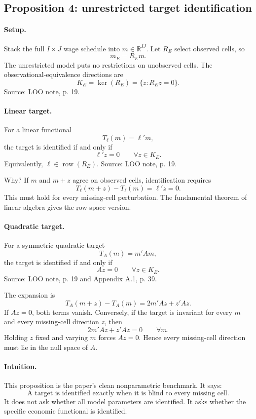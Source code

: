 \documentclass[11pt]{article}
\newcommand{\R}{\mathbb{R}}
\newcommand{\row}{\operatorname{row}}
\begin{document}
\subsection{Proposition 4: unrestricted target identification}

\paragraph{Setup.}
Stack the full \(I\times J\) wage schedule into \(m\in\R^{IJ}\). Let \(R_E\)
select observed cells, so
\[
m_E=R_E m.
\]
The unrestricted model puts no restrictions on unobserved cells. The
observational-equivalence directions are
\[
K_E=\ker(R_E)=\{z:R_E z=0\}.
\]
Source: LOO note, p. 19.

\paragraph{Linear target.}
For a linear functional
\[
T_\ell(m)=\ell'm,
\]
the target is identified if and only if
\[
\ell'z=0\qquad\forall z\in K_E.
\]
Equivalently, \(\ell\in \row(R_E)\). Source: LOO note, p. 19.

Why? If \(m\) and \(m+z\) agree on observed cells, identification requires
\[
T_\ell(m+z)-T_\ell(m)=\ell'z=0.
\]
This must hold for every missing-cell perturbation. The fundamental theorem of
linear algebra gives the row-space version.

\paragraph{Quadratic target.}
For a symmetric quadratic target
\[
T_A(m)=m'Am,
\]
the target is identified if and only if
\[
Az=0\qquad\forall z\in K_E.
\]
Source: LOO note, p. 19 and Appendix A.1, p. 39.

The expansion is
\[
T_A(m+z)-T_A(m)
=
2m'Az+z'Az.
\]
If \(Az=0\), both terms vanish. Conversely, if the target is invariant for every
\(m\) and every missing-cell direction \(z\), then
\[
2m'Az+z'Az=0\qquad\forall m.
\]
Holding \(z\) fixed and varying \(m\) forces \(Az=0\). Hence every missing-cell
direction must lie in the null space of \(A\).

\paragraph{Intuition.}
This proposition is the paper's clean nonparametric benchmark. It says:
\[
\text{A target is identified exactly when it is blind to every missing cell.}
\]
It does not ask whether all model parameters are identified. It asks whether the
specific economic functional is identified.
\end{document}
